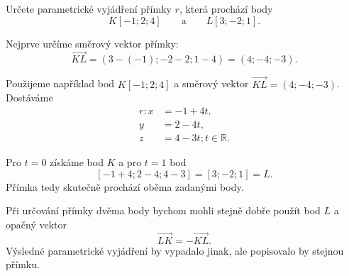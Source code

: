 \begin{example}
    \label{exa:Parametric_line_in_space_two_points}
    Určete parametrické vyjádření přímky $r$, která prochází body
    \[
        K[-1;2;4]
        \qquad\text{a}\qquad
        L[3;-2;1].
    \]

    Nejprve určíme směrový vektor přímky:
    \[
        \overrightarrow{KL}
        =
        (3-(-1);-2-2;1-4)
        =
        (4;-4;-3).
    \]

    Použijeme například bod $K[-1;2;4]$ a směrový vektor
    $\overrightarrow{KL}=(4;-4;-3)$. Dostáváme
    \[
        \begin{aligned}
            r: x&=-1+4t,\\
            y&=2-4t,\\
            z&=4-3t; t\in\mathbb{R}.
        \end{aligned}
    \]

    Pro $t=0$ získáme bod $K$ a pro $t=1$ bod
    \[
        [-1+4;2-4;4-3]
        =
        [3;-2;1]
        =
        L.
    \]
    Přímka tedy skutečně prochází oběma zadanými body.
\end{example}

Při určování přímky dvěma body bychom mohli stejně dobře použít bod $L$
a opačný vektor
\[
    \overrightarrow{LK}
    =
    -\overrightarrow{KL}.
\]
Výsledné parametrické vyjádření by vypadalo jinak, ale popisovalo by
stejnou přímku.
